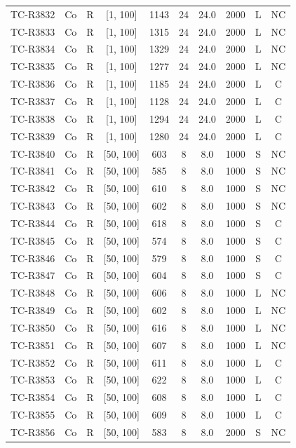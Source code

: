 \begin{longtable}{lccccccccc}
TC-R3832 & Co & R & [1, 100] & 1143 & 24 & 24.0 & 2000 & L & NC \\
TC-R3833 & Co & R & [1, 100] & 1315 & 24 & 24.0 & 2000 & L & NC \\
TC-R3834 & Co & R & [1, 100] & 1329 & 24 & 24.0 & 2000 & L & NC \\
TC-R3835 & Co & R & [1, 100] & 1277 & 24 & 24.0 & 2000 & L & NC \\
TC-R3836 & Co & R & [1, 100] & 1185 & 24 & 24.0 & 2000 & L & C \\
TC-R3837 & Co & R & [1, 100] & 1128 & 24 & 24.0 & 2000 & L & C \\
TC-R3838 & Co & R & [1, 100] & 1294 & 24 & 24.0 & 2000 & L & C \\
TC-R3839 & Co & R & [1, 100] & 1280 & 24 & 24.0 & 2000 & L & C \\
TC-R3840 & Co & R & [50, 100] & 603 & 8 & 8.0 & 1000 & S & NC \\
TC-R3841 & Co & R & [50, 100] & 585 & 8 & 8.0 & 1000 & S & NC \\
TC-R3842 & Co & R & [50, 100] & 610 & 8 & 8.0 & 1000 & S & NC \\
TC-R3843 & Co & R & [50, 100] & 602 & 8 & 8.0 & 1000 & S & NC \\
TC-R3844 & Co & R & [50, 100] & 618 & 8 & 8.0 & 1000 & S & C \\
TC-R3845 & Co & R & [50, 100] & 574 & 8 & 8.0 & 1000 & S & C \\
TC-R3846 & Co & R & [50, 100] & 579 & 8 & 8.0 & 1000 & S & C \\
TC-R3847 & Co & R & [50, 100] & 604 & 8 & 8.0 & 1000 & S & C \\
TC-R3848 & Co & R & [50, 100] & 606 & 8 & 8.0 & 1000 & L & NC \\
TC-R3849 & Co & R & [50, 100] & 602 & 8 & 8.0 & 1000 & L & NC \\
TC-R3850 & Co & R & [50, 100] & 616 & 8 & 8.0 & 1000 & L & NC \\
TC-R3851 & Co & R & [50, 100] & 607 & 8 & 8.0 & 1000 & L & NC \\
TC-R3852 & Co & R & [50, 100] & 611 & 8 & 8.0 & 1000 & L & C \\
TC-R3853 & Co & R & [50, 100] & 622 & 8 & 8.0 & 1000 & L & C \\
TC-R3854 & Co & R & [50, 100] & 608 & 8 & 8.0 & 1000 & L & C \\
TC-R3855 & Co & R & [50, 100] & 609 & 8 & 8.0 & 1000 & L & C \\
TC-R3856 & Co & R & [50, 100] & 583 & 8 & 8.0 & 2000 & S & NC \\

\end{longtable}
